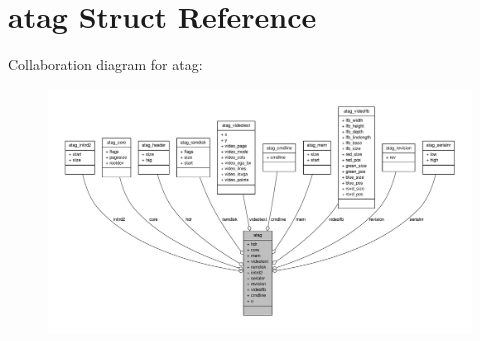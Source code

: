 \hypertarget{structatag}{\section{atag \-Struct \-Reference}
\label{structatag}
}


\-Collaboration diagram for atag\-:
\nopagebreak
\begin{figure}[H]
\begin{center}
\leavevmode
\includegraphics[width=350pt]{structatag__coll__graph}
\end{center}
\end{figure}
